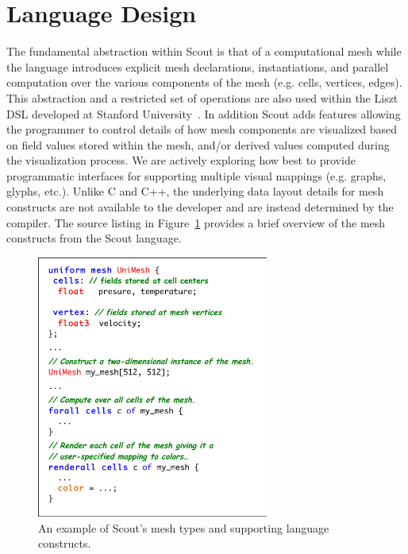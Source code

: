\documentclass{tcvg}
\begin{document}
  \section*{Language Design}

    The fundamental abstraction within Scout is that of a computational mesh
    while the language introduces explicit mesh declarations, instantiations,
    and parallel computation over the various components of the mesh (e.g. cells, 
    vertices, edges).  This abstraction and a restricted set of operations are
    also used within the Liszt DSL developed at Stanford 
    University~\cite{DeVito:2011:LDS}.  In addition Scout
    adds features allowing the programmer to control details of how  
    mesh components are visualized based on field values stored within the mesh, and/or 
    derived values computed during the visualization process. We are actively 
    exploring how best to provide programmatic interfaces for supporting multiple 
    visual mappings (e.g. graphs, glyphs, etc.). Unlike C and C++, the underlying 
    data layout details for mesh constructs are not available to the developer 
    and are instead determined by the compiler. The source listing in 
    Figure~\ref{fig:source} provides a brief overview of the mesh constructs 
    from the Scout language. 
     
	\begin{figure}[b!]
		\centering
		\includegraphics[width=3.00in]{figures/source-fig-v2.pdf}
		\caption{An example of Scout's mesh types and supporting language constructs.}
	\label{fig:source}
   \end{figure}
\end{document}
